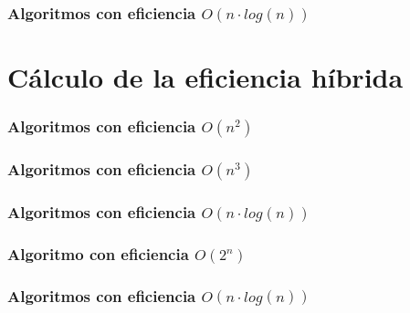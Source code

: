 \documentclass[12pt,spanish]{article}
\begin{document}
\subsubsection{Algoritmos con eficiencia $O(n \cdot log(n))$}

\section{Cálculo de la eficiencia híbrida}

\subsubsection{Algoritmos con eficiencia $O(n^2)$}

\subsubsection{Algoritmos con eficiencia $O(n^3)$}

\subsubsection{Algoritmos con eficiencia $O(n \cdot log(n))$}

\subsubsection{Algoritmo con eficiencia $O(2^n)$}

\subsubsection{Algoritmos con eficiencia $O(n \cdot log(n))$}

\end{document}
